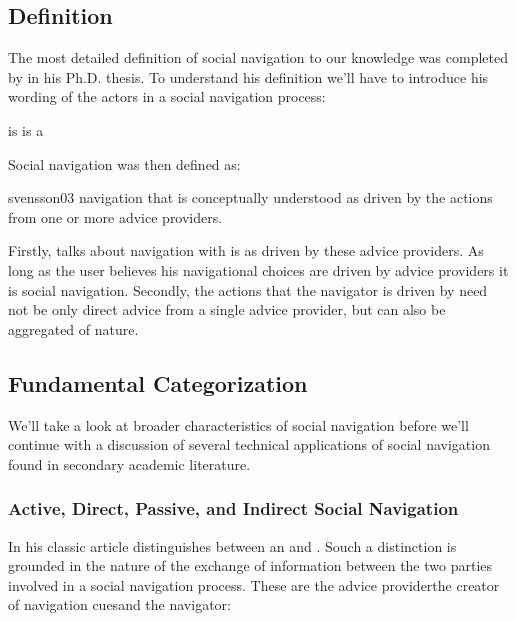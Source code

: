 \subsection{Definition}

The most detailed definition of social navigation to our knowledge was
completed by \citet{svensson03} in his Ph.D. thesis. To understand his
definition we'll have to introduce his wording of the actors in a social
navigation process:

\begin{items}
   is 
   is a 
\end{items}

Social navigation was then defined as:

\begin{citequote}[p.~20]{svensson03}
  navigation that is conceptually understood as driven by the actions from one
  or more advice providers.
\end{citequote}

Firstly, \citeauthor{svensson03} talks about navigation with is
 as driven by these advice providers. As long as
the user believes his navigational choices are driven by advice providers it
is social navigation. Secondly, the actions that the navigator is driven by
need not be only direct advice from a single advice provider, but can also be
aggregated of nature.

\subsection{Fundamental Categorization}

We'll take a look at broader characteristics of social navigation
before we'll continue with a discussion of several technical applications of
social navigation found in secondary academic literature.

\subsubsection{Active, Direct, Passive, and Indirect Social Navigation}

In his classic article \citet{dieberger97} distinguishes between an
 and .
Souch a distinction is grounded in the nature of the exchange of information
between the two parties involved in a social navigation process.
These are the advice provider\dash{}the creator of navigation
cues\dash{}and the navigator:

